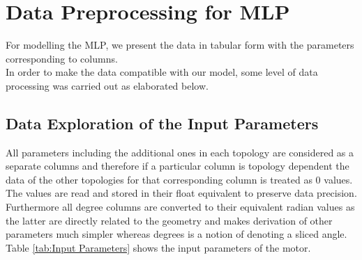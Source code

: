 \documentclass{report} %
\begin{document}
\section{Data Preprocessing for \ac{MLP}}\label{sec:Data Preprocessing for MLP}

For modelling the \ac{MLP}, we present the data in tabular form with the parameters corresponding to columns. \\
In order to make the data compatible with our model, some level of data processing was carried out as elaborated below.

\subsection{Data Exploration of the Input Parameters}\label{sec:Deep Dive into Input Parameters}
All parameters including the additional ones in each topology are considered as a separate columns and therefore if a particular column is topology dependent the data of the other topologies for that corresponding column is treated as 0 values.\\
The values are read and stored in their float equivalent to preserve data precision. \\
Furthermore all degree columns are converted to their equivalent radian values as the latter are directly related to the geometry and makes derivation of other parameters much simpler whereas degrees is a notion of denoting a sliced angle.\\

Table \ref{tab:Input Parameters} shows the input parameters of the motor. 
\end{document}

